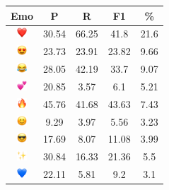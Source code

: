 \documentclass{article}
\begin{document}
\begin{table}
\centering
\begin{tabular}{|c|ccc|c|} \hline
\textbf{Emo} & \textbf{P} & \textbf{R} & \textbf{F1} & \textbf{\%} \\ \hline
\includegraphics[height=0.37cm,width=0.37cm]{img/red_heart.png} & 30.54 & 66.25 & 41.8 & 21.6\\ 
\includegraphics[height=0.37cm,width=0.37cm]{img/smiling_face_with_hearteyes.png} & 23.73 & 23.91 & 23.82 & 9.66\\ 
\includegraphics[height=0.37cm,width=0.37cm]{img/face_with_tears_of_joy.png} & 28.05 & 42.19 & 33.7 & 9.07\\ 
\includegraphics[height=0.37cm,width=0.37cm]{img/two_hearts.png} & 20.85 & 3.57 & 6.1 & 5.21\\ 
\includegraphics[height=0.37cm,width=0.37cm]{img/fire.png} & 45.76 & 41.68 & 43.63 & 7.43\\ 
\includegraphics[height=0.37cm,width=0.37cm]{img/smiling_face_with_smiling_eyes.png} & 9.29 & 3.97 & 5.56 & 3.23\\ 
\includegraphics[height=0.37cm,width=0.37cm]{img/smiling_face_with_sunglasses.png} & 17.69 & 8.07 & 11.08 & 3.99\\ 
\includegraphics[height=0.37cm,width=0.37cm]{img/sparkles.png} & 30.84 & 16.33 & 21.36 & 5.5\\ 
\includegraphics[height=0.37cm,width=0.37cm]{img/blue_heart.png} & 22.11 & 5.81 & 9.2 & 3.1\\ 

\end{tabular}
\end{table}
\end{document}
